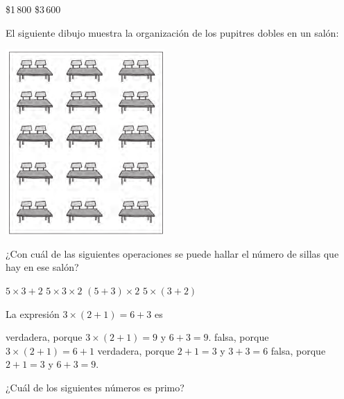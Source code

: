\documentclass[10pt,letterpaper,addpoints]{exam}
\begin{document}
\begin{multicols}{2}
\begin{questions}
\begin{multicols}{2}
\begin{choices}
\choice \$1\,800
\choice \$3\,600
\end{choices}
\end{multicols}
\question El siguiente dibujo muestra la organización de los pupitres dobles en un salón:
\begin{center}
\includegraphics[scale=.5]{Images/sillas.png} 
\end{center}
¿Con cuál de las siguientes operaciones se puede hallar el número de sillas que hay en ese   salón?
\begin{multicols}{2}
\begin{choices}
\choice $5\times 3+2$
\CorrectChoice $5\times 3 \times 2$
\choice $(5+3)\times 2$
\choice $5\times (3+2)$
\end{choices}
\end{multicols}
\question La expresión $3\times (2+1)=6+3$ es
\begin{choices}
\CorrectChoice verdadera, porque $3\times (2+1)=9$ y $6+3=9$.
\choice falsa, porque $3\times (2+1)=6+1$
\choice verdadera, porque $2+1=3$ y $3+3=6$
\choice falsa, porque $2+1=3$ y $6+3=9$.
\end{choices}
\question ¿Cuál de los siguientes números es primo?


\end{questions}
\end{multicols}
\end{document}
